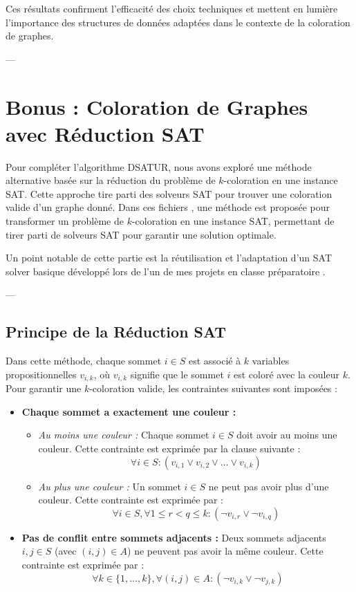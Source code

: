 \documentclass[11pt]{article}
\begin{document}
Ces résultats confirment l’efficacité des choix techniques et mettent en lumière l’importance des structures de données adaptées dans le contexte de la coloration de graphes.

---

\section{Bonus : Coloration de Graphes avec Réduction SAT}

Pour compléter l'algorithme DSATUR, nous avons exploré une méthode alternative basée sur la réduction du problème de \(k\)-coloration en une instance SAT. Cette approche tire parti des solveurs SAT pour trouver une coloration valide d'un graphe donné.
Dans ces fichiers \cite{k_coloring_sat} \cite{coloring_course}, une méthode est proposée pour transformer un problème de \(k\)-coloration en une instance SAT, permettant de tirer parti de solveurs SAT pour garantir une solution optimale.

Un point notable de cette partie est la réutilisation et l'adaptation d'un SAT solver basique développé lors de l'un de mes projets en classe préparatoire \cite{duff_sat_solver}.

---

\subsection{Principe de la Réduction SAT}

Dans cette méthode, chaque sommet \(i \in S\) est associé à \(k\) variables propositionnelles \(v_{i,k}\), où \(v_{i,k}\) signifie que le sommet \(i\) est coloré avec la couleur \(k\). Pour garantir une \(k\)-coloration valide, les contraintes suivantes sont imposées :

\begin{itemize}
    \item \textbf{Chaque sommet a exactement une couleur :}
        \begin{itemize}
            \item \textit{Au moins une couleur :} Chaque sommet \(i \in S\) doit avoir au moins une couleur. Cette contrainte est exprimée par la clause suivante :
            \[
            \forall i \in S : (v_{i,1} \lor v_{i,2} \lor \ldots \lor v_{i,k})
            \]
            \item \textit{Au plus une couleur :} Un sommet \(i \in S\) ne peut pas avoir plus d'une couleur. Cette contrainte est exprimée par :
            \[
            \forall i \in S, \forall 1 \leq r < q \leq k : (\neg v_{i,r} \lor \neg v_{i,q})
            \]
        \end{itemize}
    \item \textbf{Pas de conflit entre sommets adjacents :} Deux sommets adjacents \(i, j \in S\) (avec \((i, j) \in A\)) ne peuvent pas avoir la même couleur. Cette contrainte est exprimée par :
    \[
    \forall k \in \{1, \ldots, k\}, \forall (i, j) \in A : (\neg v_{i,k} \lor \neg v_{j,k})
    \]
\end{itemize}
\end{document}

